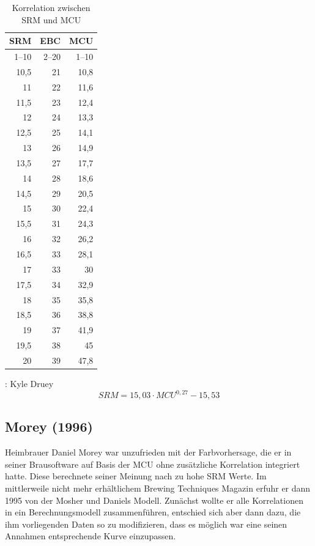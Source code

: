 \documentclass[a4paper,parskip=half]{scrartcl}
\newcommand{\MCUL}{\mathit{MCU}}
\newcommand{\SRM}{\mathit{SRM}}
\begin{document}
\begin{table}[H]
\centering
\begin{tabular}{rrr}
\toprule
\multicolumn{1}{c}{\textbf{SRM}} & \multicolumn{1}{c}{\textbf{EBC}} & \multicolumn{1}{c}{\textbf{MCU}} \\
\midrule
1–10 & 2–20 & 1–10 \\
10,5 & 21 & 10,8 \\
11   & 22 & 11,6 \\
11,5 & 23 & 12,4 \\
12   & 24 & 13,3 \\
12,5 & 25 & 14,1 \\
13   & 26 & 14,9 \\
13,5 & 27 & 17,7 \\
14   & 28 & 18,6 \\
14,5 & 29 & 20,5 \\
15   & 30 & 22,4 \\
15,5 & 31 & 24,3 \\
16   & 32 & 26,2 \\
16,5 & 33 & 28,1 \\
17   & 33 & 30 \\
17,5 & 34 & 32,9 \\
18   & 35 & 35,8 \\
18,5 & 36 & 38,8 \\
19   & 37 & 41,9 \\
19,5 & 38 & 45 \\
20   & 39 & 47,8 \\
\bottomrule
\end{tabular}
\caption{Korrelation zwischen SRM und MCU \parencite[206]{Noonan1996}}
\label{table:mcunoonan}
\end{table}

\parencite{Druey1998}:
Kyle Druey
\begin{equation}
\SRM = 15,03 \cdot \MCUL^{0,27} - 15,53
\label{eq:mcunoonandruey}
\end{equation}

\subsection*{Morey (1996)}

Heimbrauer Daniel Morey war unzufrieden mit der Farbvorhersage, die er in seiner Brausoftware auf Basis der MCU ohne zusätzliche Korrelation integriert hatte. Diese berechnete seiner Meinung nach zu hohe SRM Werte. Im mittlerweile nicht mehr erhältlichem Brewing Techniques Magazin erfuhr er dann 1995 von der Mosher und Daniels Modell. Zunächst wollte er alle Korrelationen in ein Berechnungsmodell zusammenführen, entschied sich aber dann dazu, die ihm vorliegenden Daten so zu modifizieren, dass es möglich war eine seinen Annahmen entsprechende Kurve einzupassen. \parencite{Smith2010}
\end{document}
